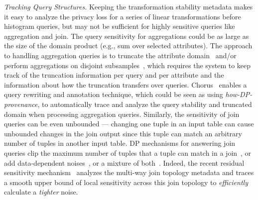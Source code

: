 \noindent
\emph{Tracking Query Structures.}
Keeping the transformation stability metadata makes it easy to analyze the privacy loss for a series of linear transformations before histogram queries, but may not be sufficient for highly sensitive queries like aggregation and join.
The query sensitivity for aggregations could be as large as the size of the domain product (e.g., sum over selected attributes).
The approach to handling aggregation queries is to truncate the attribute domain~\cite{johnson2020chorus,FangD022shifted,dong2023universal} and/or perform aggregations on disjoint subsamples~\cite{nissim2007smooth,mohan2012gupt,Smith11sample_aggregate,johnson2020chorus}, which requires the system to keep track of the truncation information per query and per attribute and the information about how the truncation transfers over queries.
Chorus~\cite{johnson2020chorus} enables a query rewriting and annotation technique, which could be seen as using \textit{how-DP-provenance}, to automatically trace and analyze the query stability and truncated domain when processing aggregation queries.
Similarly, the sensitivity of join queries can be even unbounded — changing one tuple in an input table can cause unbounded changes in the join output since this tuple can match an arbitrary number of tuples in another input table.
DP mechanisms for answering join queries clip the maximum number of tuples that a tuple can match in a join~\cite{kotsogiannis2019privatesql}, or add data-dependent noises~\cite{nissim2007smooth,johnson2018towards,dong2021residual,dong2021nearly}, or a mixture of both~\cite{dong2022r2t}.
Indeed, the recent residual sensitivity mechanism~\cite{dong2021residual} analyzes the multi-way join topology metadata and traces a smooth upper bound of local sensitivity across this join topology to \textit{efficiently} calculate a \textit{tighter} noise.


